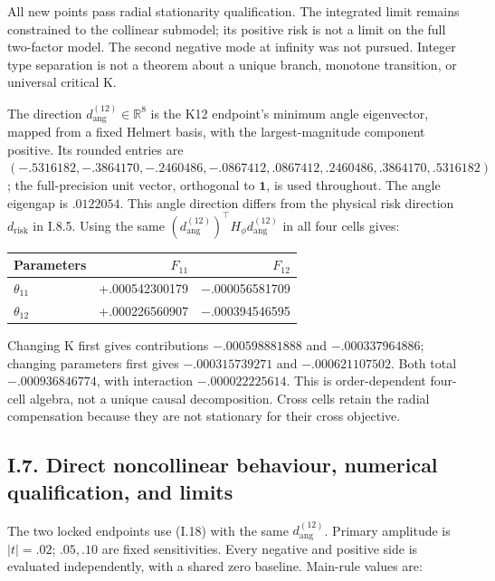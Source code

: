 \documentclass{article}
\begin{document}
All new points pass radial stationarity qualification. The integrated
limit remains constrained to the collinear submodel; its positive risk
is not a limit on the full two-factor model. The second negative mode at
infinity was not pursued. Integer type separation is not a theorem about
a unique branch, monotone transition, or universal critical K.

The direction \(d_{\mathrm{ang}}^{(12)}\in\mathbb R^8\) is the K12
endpoint's minimum angle eigenvector, mapped from a fixed Helmert basis,
with the largest-magnitude component positive. Its rounded entries are
\((-.5316182,-.3864170,-.2460486,-.0867412,.0867412,.2460486,.3864170,.5316182)\);
the full-precision unit vector, orthogonal to \(\mathbf1\), is used
throughout. The angle eigengap is \(.0122054\). This angle direction
differs from the physical risk direction \(d_{\mathrm{risk}}\) in I.8.5.
Using the same
\((d_{\mathrm{ang}}^{(12)})^\top H_\phi d_{\mathrm{ang}}^{(12)}\) in all
four cells gives:

\begin{longtable}[]{@{}lrr@{}}
\toprule\noalign{}
Parameters & \(F_{11}\) & \(F_{12}\) \\
\midrule\noalign{}
\endhead
\bottomrule\noalign{}
\endlastfoot
\(\theta_{11}\) & +.000542300179 & −.000056581709 \\
\(\theta_{12}\) & +.000226560907 & −.000394546595 \\
\end{longtable}

Changing K first gives contributions \(−.000598881888\) and
\(−.000337964886\); changing parameters first gives \(−.000315739271\)
and \(−.000621107502\). Both total \(−.000936846774\), with interaction
\(−.000022225614\). This is order-dependent four-cell algebra, not a
unique causal decomposition. Cross cells retain the radial compensation
because they are not stationary for their cross objective.

\subsection*{I.7. Direct noncollinear behaviour, numerical qualification,
and
limits}\label{i.7.-direct-noncollinear-behaviour-numerical-qualification-and-limits}

The two locked endpoints use (I.18) with the same
\(d_{\mathrm{ang}}^{(12)}\). Primary amplitude is \(|t|=.02\);
\(.05,.10\) are fixed sensitivities. Every negative and positive side is
evaluated independently, with a shared zero baseline. Main-rule values
are:
\end{document}

